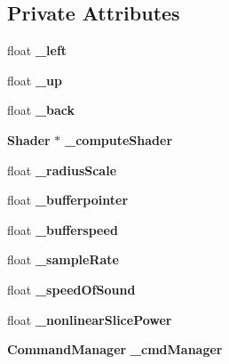\subsection*{Private Attributes}
\begin{DoxyCompactItemize}
\item 
float {\bfseries \-\_\-left}\label{classSoundfieldViewer_1_1ShaderSoundfieldViewerGreen_a4c9d246241c9efc7efaabf11ce0c2d5f}

\item 
float {\bfseries \-\_\-up}\label{classSoundfieldViewer_1_1ShaderSoundfieldViewerGreen_a0d78763f5c27d2661f4da6f87359d166}

\item 
float {\bfseries \-\_\-back}\label{classSoundfieldViewer_1_1ShaderSoundfieldViewerGreen_a387aa3c5c80c50b755a232ae6b5a6361}

\item 
{\bf Shader} $\ast$ {\bfseries \-\_\-compute\-Shader}\label{classSoundfieldViewer_1_1ShaderSoundfieldViewerGreen_a26fbc338e4003dbaf1af6e8163cd59a1}

\item 
float {\bfseries \-\_\-radius\-Scale}\label{classSoundfieldViewer_1_1ShaderSoundfieldViewerGreen_a84650463a7b5fd234f1ee21cd74ba96d}

\item 
float {\bfseries \-\_\-bufferpointer}\label{classSoundfieldViewer_1_1ShaderSoundfieldViewerGreen_a10d8f266d40ba6076390f0097878d3e9}

\item 
float {\bfseries \-\_\-bufferspeed}\label{classSoundfieldViewer_1_1ShaderSoundfieldViewerGreen_afca90c0987c1c93a9bacfa5831583016}

\item 
float {\bfseries \-\_\-sample\-Rate}\label{classSoundfieldViewer_1_1ShaderSoundfieldViewerGreen_a6288af04cacf44eb08cd52f529bd4f0c}

\item 
float {\bfseries \-\_\-speed\-Of\-Sound}\label{classSoundfieldViewer_1_1ShaderSoundfieldViewerGreen_a5a7d9e7a97c7cb55177f1acb721ff877}

\item 
float {\bfseries \-\_\-nonlinear\-Slice\-Power}\label{classSoundfieldViewer_1_1ShaderSoundfieldViewerGreen_a1bb5c28991bbd7610a13958510f3aaa2}

\item 
{\bf Command\-Manager} {\bfseries \-\_\-cmd\-Manager}\label{classSoundfieldViewer_1_1ShaderSoundfieldViewerGreen_a6e3bc48f0d16173d7a6d9bc1f000f52e}

\end{DoxyCompactItemize}
